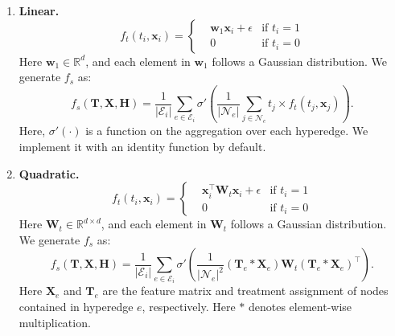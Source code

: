 \begin{enumerate}
    \item \textbf{Linear.}
      \begin{equation}
        f_t(t_i, \mathbf{x}_i) = \left\{
        \begin{aligned}
        & \mathbf{w}_1\mathbf{x}_i + \epsilon & \text{if } t_i=1\\
        & 0 & \text{if } t_i=0
        \end{aligned}\right.
    \end{equation}
Here $\mathbf{w}_1 \in \mathbb{R}^d$, and each element in $\mathbf{w}_1$ follows a Gaussian distribution. 
We generate $f_s$ as:
\begin{equation}
    f_s(\mathbf{T},\mathbf{X},\mathbf{H}) = \frac{1}{|\mathcal{E}_i|} \sum_{e\in\mathcal{E}_i} \sigma'(\frac{1}{|\mathcal{N}_e|}\sum_{j\in \mathcal{N}_e} t_j \times f_t(t_j, \mathbf{x}_j)).
\end{equation}
Here, $\sigma'(\cdot)$ is a function on the aggregation over each hyperedge. We implement it with an identity function by default.
    \item \textbf{Quadratic.}
     \begin{equation}
        f_t(t_i, \mathbf{x}_i) = \left\{
        \begin{aligned}
        & \mathbf{x}_i^\top\mathbf{W}_t\mathbf{x}_i + \epsilon & \text{if } t_i=1\\
        & 0 & \text{if } t_i=0
        \end{aligned}\right.
    \end{equation}
Here $\mathbf{W}_t \in \mathbb{R}^{d\times d}$, and each element in $\mathbf{W}_t$ follows a Gaussian distribution. 
We generate $f_s$ as:
\begin{equation}
    f_s(\mathbf{T},\mathbf{X},\mathbf{H}) = \frac{1}{|\mathcal{E}_i|} \sum_{e\in\mathcal{E}_i} \sigma'(\frac{1}{|\mathcal{N}_e|^2}(\mathbf{T}_e*\mathbf{X}_e)\mathbf{W}_t(\mathbf{T}_e*\mathbf{X}_e)^\top).
  \end{equation}    
  Here $\mathbf{X}_e$ and $\mathbf{T}_e$ are the feature matrix and treatment assignment of nodes contained in hyperedge $e$,  respectively. Here $*$ denotes element-wise multiplication.
\end{enumerate}

